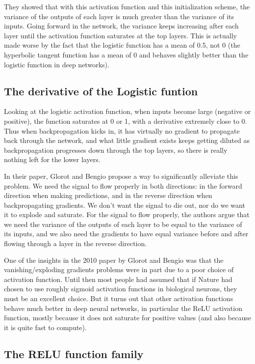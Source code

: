 \documentclass[%
oneside,                 %
final,                   %
10pt]{article}
\begin{document}
They showed that with this activation function and this
initialization scheme, the variance of the outputs of each layer is
much greater than the variance of its inputs. Going forward in the
network, the variance keeps increasing after each layer until the
activation function saturates at the top layers. This is actually made
worse by the fact that the logistic function has a mean of 0.5, not 0
(the hyperbolic tangent function has a mean of 0 and behaves slightly
better than the logistic function in deep networks).

\subsection{The derivative of the Logistic funtion}

Looking at the logistic activation function, when inputs become large
(negative or positive), the function saturates at 0 or 1, with a
derivative extremely close to 0. Thus when backpropagation kicks in,
it has virtually no gradient to propagate back through the network,
and what little gradient exists keeps getting diluted as
backpropagation progresses down through the top layers, so there is
really nothing left for the lower layers.

In their paper, Glorot and Bengio propose a way to significantly
alleviate this problem. We need the signal to flow properly in both
directions: in the forward direction when making predictions, and in
the reverse direction when backpropagating gradients. We don’t want
the signal to die out, nor do we want it to explode and saturate. For
the signal to flow properly, the authors argue that we need the
variance of the outputs of each layer to be equal to the variance of
its inputs, and we also need the gradients to have equal variance
before and after flowing through a layer in the reverse direction.

One of the insights in the 2010 paper by Glorot and Bengio was that
the vanishing/exploding gradients problems were in part due to a poor
choice of activation function. Until then most people had assumed that
if Nature had chosen to use roughly sigmoid activation functions in
biological neurons, they must be an excellent choice. But it turns out
that other activation functions behave much better in deep neural
networks, in particular the ReLU activation function, mostly because
it does not saturate for positive values (and also because it is quite
fast to compute).

\subsection{The RELU function family}
\end{document}
